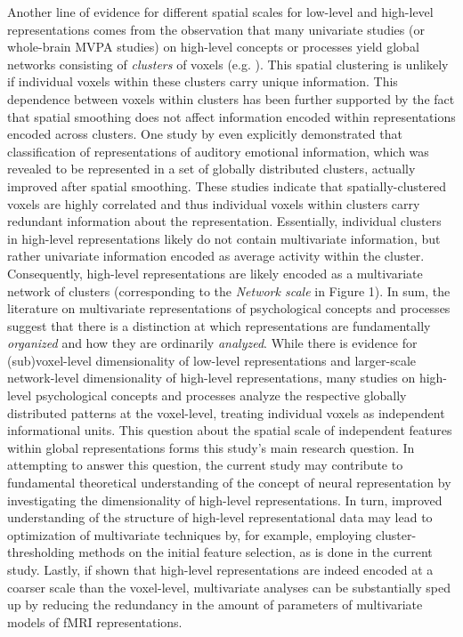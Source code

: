 \documentclass[jou,12pt,a4paper]{apa6}
\begin{document}
Another line of evidence for different spatial scales for low-level and high-level representations comes from the observation that many univariate studies (or whole-brain MVPA studies) on high-level concepts or processes yield global networks consisting of \emph{clusters} of voxels (e.g. ). This spatial clustering is unlikely if individual voxels within these clusters carry unique information. This dependence between voxels within clusters has been further supported by the fact that spatial smoothing \cite{oosterwijk2015,kassam2013} does not affect information encoded within representations encoded across clusters. One study by  even explicitly demonstrated that classification of representations of auditory emotional information, which was revealed to be represented in a set of globally distributed clusters, actually improved after spatial smoothing. These studies indicate that spatially-clustered voxels are highly correlated and thus individual voxels within clusters carry redundant information about the representation. Essentially, individual clusters in high-level representations likely do not contain multivariate information, but rather univariate information encoded as average activity within the cluster. Consequently, high-level representations are likely encoded as a multivariate network of clusters (corresponding to the \emph{Network scale} in Figure 1). 
In sum, the literature on multivariate representations of psychological concepts and processes suggest that there is a distinction at which representations are fundamentally \emph{organized} and how they are ordinarily \emph{analyzed}. While there is evidence for (sub)voxel-level dimensionality of low-level representations and larger-scale network-level dimensionality of high-level representations, many studies on high-level psychological concepts and processes analyze the respective globally distributed patterns at the voxel-level, treating individual voxels as independent informational units. This question about the spatial scale of independent features within global representations forms this study's main research question. In attempting to answer this question, the current study may contribute to fundamental theoretical understanding of the concept of neural representation by investigating the dimensionality of high-level representations. In turn, improved understanding of the structure of high-level representational data may lead to optimization of multivariate techniques by, for example, employing cluster-thresholding methods on the initial feature selection, as is done in the current study. Lastly, if shown that high-level representations are indeed encoded at a coarser scale than the voxel-level, multivariate analyses can be substantially sped up by reducing the redundancy in the amount of parameters of multivariate models of fMRI representations.
\end{document}

